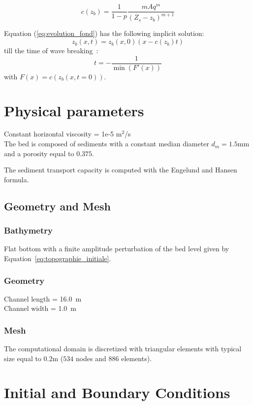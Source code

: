 \begin{equation}
c (z_b)=\frac{1}{1-p}\frac{m A q^m}{ (Z_s-z_b)^{m+1}}
\end{equation}

Equation (\ref{eq:evolution_fond}) has the following implicit solution:
\begin{equation}
z_b(x,t)=z_b(x,0)(x-c(z_b)t)
\end{equation}
till the time of wave breaking~\cite{Kubatko2008}:
\begin{equation}
t=-\frac{1}{\min (F' (x))}
\end{equation}
with $F(x)=c (z_b (x,t=0))$.

\section{Physical parameters}
%
Constant horizontal viscosity = 1e-5 m$^2$/s\\

The bed is composed of sediments with a constant median diameter $d_m=1.5$mm and a porosity equal to $0.375$.

The sediment transport capacity is computed with the Engelund and Hansen formula.
%
\subsection{Geometry and Mesh}
%
\subsubsection{Bathymetry}
%
Flat bottom with a finite amplitude perturbation of the bed level given by Equation~\ref{eq:topographie_initiale}.

\subsubsection{Geometry}
%
Channel length = 16.0~m\\
Channel width = 1.0~m

\subsubsection{Mesh}
%
The computational domain is discretized with triangular elements with typical size equal to $0.2$m ($534$ nodes and $886$ elements).

\section{Initial and Boundary Conditions}

